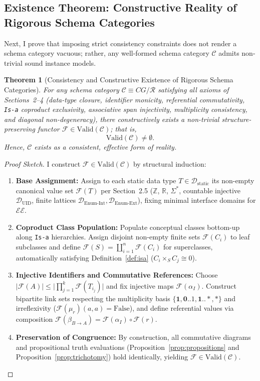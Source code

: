\documentclass[11pt,a4paper]{article}
\theoremstyle{definition}
\theoremstyle{plain}
\newtheorem{theorem}{Theorem}[section]
\theoremstyle{remark}
\newcommand{\Valid}{\mathrm{Valid}}
\newcommand{\Dstatic}{\mathcal{D}_{\mathrm{static}}}
\newcommand{\Duid}{\mathcal{D}_{\mathrm{UID}}}
\newcommand{\Denumint}{\mathcal{D}_{\mathrm{Enum\text{-}Int}}}
\newcommand{\Denumext}{\mathcal{D}_{\mathrm{Enum\text{-}Ext}}}
\begin{document}
\subsection{Existence Theorem: Constructive Reality of Rigorous Schema Categories}
Next, I prove that imposing strict consistency constraints does not render a schema category vacuous; rather, any well-formed schema category $\mathcal{C}$ admits non-trivial sound instance models.

\begin{theorem}[Consistency and Constructive Existence of Rigorous Schema Categories]\label{thm:existence}
For any schema category $\mathcal{C} \equiv CG/\mathcal{R}$ satisfying all axioms of Sections~2--4 (data-type closure, identifier monicity, referential commutativity, \texttt{Is-a} coproduct exclusivity, associative span injectivity, multiplicity consistency, and diagonal non-degeneracy), there constructively exists a non-trivial structure-preserving functor $\mathcal{F} \in \Valid(\mathcal{C})$; that is,
\begin{equation}
\Valid(\mathcal{C}) \neq \emptyset.
\end{equation}
Hence, $\mathcal{C}$ exists as a consistent, effective form of reality.
\end{theorem}

\begin{proof}[Proof Sketch]
I construct $\mathcal{F} \in \Valid(\mathcal{C})$ by structural induction:
\begin{enumerate}
    \item \textbf{Base Assignment:} Assign to each static data type $T \in \Dstatic$ its non-empty canonical value set $\mathcal{F}(T)$ per Section~2.5 ($\mathbb{Z}$, $\mathbb{R}$, $\Sigma^*$, countable injective $\Duid$, finite lattices $\Denumint, \Denumext$), fixing minimal interface domains for $\mathcal{EE}$.
    \item \textbf{Coproduct Class Population:} Populate conceptual classes bottom-up along \texttt{Is-a} hierarchies. Assign disjoint non-empty finite sets $\mathcal{F}(C_i)$ to leaf subclasses and define $\mathcal{F}(S) = \coprod_{i=1}^n \mathcal{F}(C_i)$ for superclasses, automatically satisfying Definition~\ref{def:isa} ($C_i \times_S C_j \cong 0$).
    \item \textbf{Injective Identifiers and Commutative References:} Choose $\lvert \mathcal{F}(A) \rvert \le \lvert \prod_{j=1}^k \mathcal{F}(T_{i_j}) \rvert$ and fix injective maps $\mathcal{F}(\alpha_I)$. Construct bipartite link sets respecting the multiplicity basis $\{\mathbf{1}, \mathbf{0..1}, \mathbf{1..*}, \mathbf{*}\}$ and irreflexivity ($\mathcal{F}(\mu_r)(a, a) = \mathrm{False}$), and define referential values via composition $\mathcal{F}(\beta_{B \to A}) = \mathcal{F}(\alpha_I) \circ \mathcal{F}(r)$.
    \item \textbf{Preservation of Congruence:} By construction, all commutative diagrams and propositional truth evaluations (Proposition~\ref{prop:propositions} and Proposition~\ref{prop:trichotomy}) hold identically, yielding $\mathcal{F} \in \Valid(\mathcal{C})$. \qedhere
\end{enumerate}
\end{proof}
\end{document}
